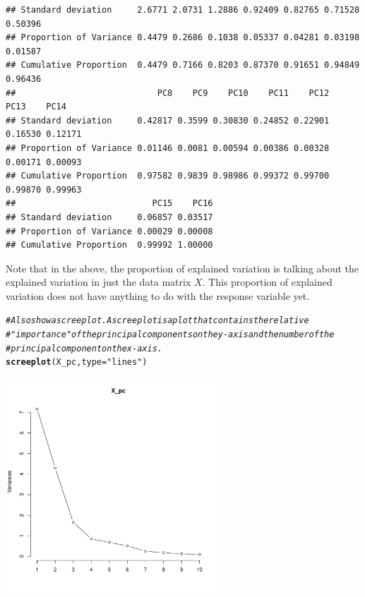 \documentclass{article}\usepackage[]{graphicx}\usepackage[]{color}
\makeatletter
\newcommand{\hlstr}[1]{\textcolor[rgb]{0.192,0.494,0.8}{#1}}%
\newcommand{\hlcom}[1]{\textcolor[rgb]{0.678,0.584,0.686}{\textit{#1}}}%
\newcommand{\hlstd}[1]{\textcolor[rgb]{0.345,0.345,0.345}{#1}}%
\newcommand{\hlkwc}[1]{\textcolor[rgb]{0.333,0.667,0.333}{#1}}%
\newcommand{\hlkwd}[1]{\textcolor[rgb]{0.737,0.353,0.396}{\textbf{#1}}}%
\newenvironment{kframe}{%
 \def\at@end@of@kframe{}%
 \ifinner\ifhmode%
  \def\at@end@of@kframe{\end{minipage}}%
  \begin{minipage}{\columnwidth}%
 \fi\fi%
 \def\FrameCommand##1{\hskip\@totalleftmargin \hskip-\fboxsep
 \colorbox{shadecolor}{##1}\hskip-\fboxsep
     \hskip-\linewidth \hskip-\@totalleftmargin \hskip\columnwidth}%
 \MakeFramed {\advance\hsize-\width
   \@totalleftmargin\z@ \linewidth\hsize
   \@setminipage}}%
 {\par\unskip\endMakeFramed%
 \at@end@of@kframe}
\newenvironment{knitrout}{}{} %
\makeatother
\begin{document}
\begin{knitrout}
\begin{kframe}
\begin{verbatim}
## Standard deviation     2.6771 2.0731 1.2886 0.92409 0.82765 0.71528 0.50396
## Proportion of Variance 0.4479 0.2686 0.1038 0.05337 0.04281 0.03198 0.01587
## Cumulative Proportion  0.4479 0.7166 0.8203 0.87370 0.91651 0.94849 0.96436
##                            PC8    PC9    PC10    PC11    PC12    PC13    PC14
## Standard deviation     0.42817 0.3599 0.30830 0.24852 0.22901 0.16530 0.12171
## Proportion of Variance 0.01146 0.0081 0.00594 0.00386 0.00328 0.00171 0.00093
## Cumulative Proportion  0.97582 0.9839 0.98986 0.99372 0.99700 0.99870 0.99963
##                           PC15    PC16
## Standard deviation     0.06857 0.03517
## Proportion of Variance 0.00029 0.00008
## Cumulative Proportion  0.99992 1.00000
\end{verbatim}
\end{kframe}
\end{knitrout}

Note that in the above, the proportion of explained variation is talking about the explained variation in just the data matrix $X$. This proportion of explained variation does not have anything to do with the response variable yet.

\begin{knitrout}
\color{fgcolor}\begin{kframe}
\begin{alltt}
\hlcom{# Also show a scree plot. A scree plot is a plot that contains the relative}
\hlcom{# "importance" of the principal components on the y-axis and the number of the}
\hlcom{# principal component on the x-axis.}
\hlkwd{screeplot}\hlstd{(X_pc,} \hlkwc{type} \hlstd{=} \hlstr{"lines"}\hlstd{)}
\end{alltt}
\end{kframe}

{\centering \includegraphics[width=0.6\textwidth]{figure/unnamed-chunk-3-1} 

}



\end{knitrout}
\end{document}
